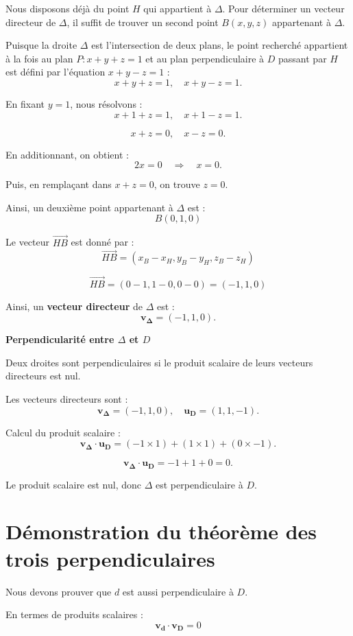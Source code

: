 \documentclass[10pt,a4paper]{article}
\begin{document}
Nous disposons déjà du point $H$ qui appartient à $\Delta$. Pour déterminer un vecteur directeur de
$\Delta$, il suffit de trouver un second point $B(x, y, z)$ appartenant à $\Delta$.

Puisque la droite $\Delta$ est l'intersection de deux plans, le point recherché appartient à la fois
au plan $P : x + y + z = 1$ et au plan perpendiculaire à $D$ passant par $H$ est défini par
l'équation  $x + y - z = 1$ :
\[
x + y + z = 1, \quad x + y - z = 1.
\]

En fixant $y = 1$, nous résolvons :
\[
x + 1 + z = 1, \quad x + 1 - z = 1.
\]

\[
x + z = 0, \quad x - z = 0.
\]

En additionnant, on obtient :
\[
2x = 0 \quad \Rightarrow \quad x = 0.
\]

Puis, en remplaçant dans $x + z = 0$, on trouve $z = 0$.

Ainsi, un deuxième point appartenant à $\Delta$ est :
\[
B(0,1,0)
\]

Le vecteur $\overrightarrow{HB}$ est donné par :
\[
\overrightarrow{HB} = (x_B - x_H, y_B - y_H, z_B - z_H)
\]

\[
\overrightarrow{HB} = (0 - 1, 1 - 0, 0 - 0) = (-1,1,0)
\]

Ainsi, un \textbf{vecteur directeur} de $\Delta$ est :
\[
\mathbf{v_{\Delta}} = (-1,1,0).
\]


\q \textbf{Perpendicularité entre $\Delta$ et $D$}

Deux droites sont perpendiculaires si le produit scalaire de leurs vecteurs directeurs est nul.

Les vecteurs directeurs sont :
\[
\mathbf{v_\Delta} = (-1,1,0), \quad \mathbf{u_D} = (1,1,-1).
\]

Calcul du produit scalaire :
\[
\mathbf{v_\Delta} \cdot \mathbf{u_D} = (-1 \times 1) + (1 \times 1) + (0 \times -1).
\]

\[
\mathbf{v_\Delta} \cdot \mathbf{u_D} = -1 + 1 + 0 = 0.
\]

Le produit scalaire est nul, donc $\Delta$ est perpendiculaire à $D$.




\section{Démonstration du théorème des trois perpendiculaires}


\q Nous devons prouver que $d$ est aussi perpendiculaire à $D$.

\q En termes de produits scalaires :
\[
\mathbf{v_d} \cdot \mathbf{v_D} = 0
\]
\end{document}
